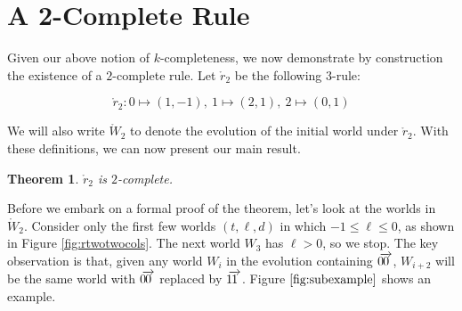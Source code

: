 \documentclass[12pt]{amsart}
\newtheorem{theorem}{Theorem}[section]
\newcommand{\laa}[1]{\hspace{-0.11cm}\overleftarrow{#1}}
\newcommand{\raa}[1]{\hspace{-0.11cm}\overrightarrow{#1}}
\newcommand{\rtwo}{\mathring{r}_2}
\newcommand{\wc}{p{0cm}}
\newcommand{\wtwo}{\mathring{W}_2}
\begin{document}
\section{A 2-Complete Rule\label{sec:proof}}

Given our above notion of $k$-completeness, we now demonstrate by construction the existence of a $2$-complete rule. Let $\rtwo$ be the following $3$-rule:

$$\rtwo : 0 \mapsto (1, -1),\ 1 \mapsto (2, 1),\ 2 \mapsto (0, 1)$$

We will also write $\wtwo$ to denote the evolution of the initial world under $\rtwo$. With these definitions, we can now present our main result.

\begin{theorem}
$\rtwo$ is $2$-complete.
\end{theorem}

Before we embark on a formal proof of the theorem, let's look at the worlds in $\wtwo$. Consider only the first few worlds $(t, \ell, d)$ in which $-1\leq \ell \leq 0$, as shown in Figure \ref{fig:rtwotwocols}. The next world $W_3$ has $\ell > 0$, so we stop. The key observation is that, given any world $W_i$ in the evolution containing $0 \raa{0}$, $W_{i+2}$ will be the same world with $0 \raa{0}$ replaced by $1 \raa{1}$. Figure $\ref{fig:subexample}$ shows an example.


\end{document}
